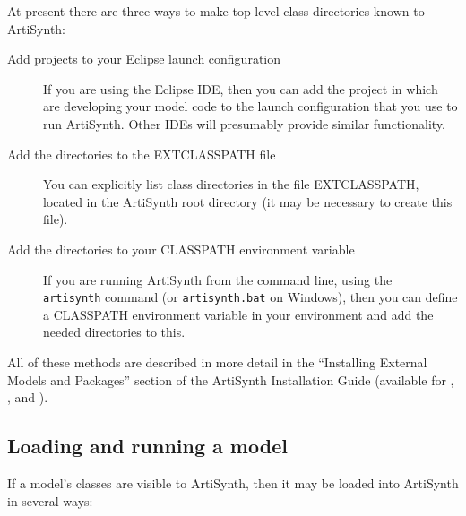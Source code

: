 At present there are three ways to make top-level class directories
known to ArtiSynth:

\begin{description}

\item[Add projects to your Eclipse launch configuration]\mbox{}

If you are using the Eclipse IDE, then you can add the project in
which are developing your model code to the launch configuration that
you use to run ArtiSynth. Other IDEs will presumably provide similar
functionality.

\item[Add the directories to the EXTCLASSPATH file]\mbox{}

You can explicitly list class directories in the file EXTCLASSPATH,
located in the ArtiSynth root directory (it may be necessary to create
this file).

\item[Add the directories to your CLASSPATH environment variable]\mbox{}

If you are running ArtiSynth from the command line, using the {\tt
artisynth} command (or {\tt artisynth.bat} on Windows), then you can
define a CLASSPATH environment variable in your environment and add
the needed directories to this.

\end{description}

All of these methods are described in more detail in the ``Installing
External Models and Packages'' section of the ArtiSynth Installation
Guide (available for 
, 
,
and 
).

\subsection{Loading and running a model}
\label{LoadingAndRunning:sec}

If a model's classes are visible to ArtiSynth, then it may be loaded
into ArtiSynth in several ways:

